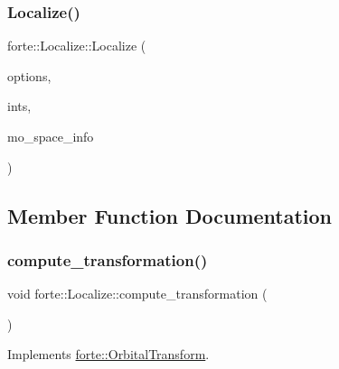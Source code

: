 \subsubsection{\texorpdfstring{Localize()}{Localize()}}
{\footnotesize\ttfamily forte\+::\+Localize\+::\+Localize (\begin{DoxyParamCaption}\item[{std\+::shared\+\_\+ptr$<$ \mbox{\hyperlink{classforte_1_1_forte_options}{Forte\+Options}} $>$}]{options,  }\item[{std\+::shared\+\_\+ptr$<$ \mbox{\hyperlink{classforte_1_1_forte_integrals}{Forte\+Integrals}} $>$}]{ints,  }\item[{std\+::shared\+\_\+ptr$<$ \mbox{\hyperlink{classforte_1_1_m_o_space_info}{M\+O\+Space\+Info}} $>$}]{mo\+\_\+space\+\_\+info }\end{DoxyParamCaption})}



\subsection{Member Function Documentation}
\mbox{\label{classforte_1_1_localize_af4858fdaa807659ad06d30925038a4c1}} 
\subsubsection{\texorpdfstring{compute\+\_\+transformation()}{compute\_transformation()}}
{\footnotesize\ttfamily void forte\+::\+Localize\+::compute\+\_\+transformation (\begin{DoxyParamCaption}{ }\end{DoxyParamCaption})\hspace{0.3cm}{\ttfamily [virtual]}}



Implements \mbox{\hyperlink{classforte_1_1_orbital_transform_a48704cbce9fd066ef7e58270bb413c25}{forte\+::\+Orbital\+Transform}}.

\mbox{\label{classforte_1_1_localize_a9ee389a31b8856a670ff4854906979af}} 
